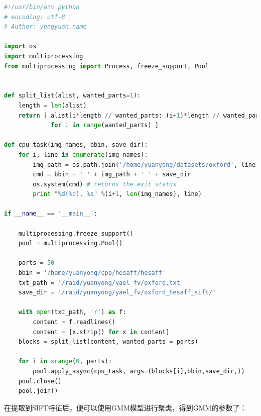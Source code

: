 \documentclass[color=cyan,mathpazo,titlestyle=hang]{elegantbook}
\begin{document}
\begin{lstlisting}[language=python]
#!/usr/bin/env python
# encoding: utf-8
# Author: yongyuan.name

import os
import multiprocessing
from multiprocessing import Process, freeze_support, Pool


def split_list(alist, wanted_parts=1):
    length = len(alist)
    return [ alist[i*length // wanted_parts: (i+1)*length // wanted_parts]
             for i in range(wanted_parts) ]
             
def cpu_task(img_names, bbin, save_dir):
    for i, line in enumerate(img_names):
        img_path = os.path.join('/home/yuanyong/datasets/oxford', line)
        cmd = bbin + ' ' + img_path + ' ' + save_dir
        os.system(cmd) # returns the exit status
        print "%d(%d), %s" %(i+1, len(img_names), line)

if __name__ == '__main__':

    multiprocessing.freeze_support()
    pool = multiprocessing.Pool()

    parts = 50
    bbin = '/home/yuanyong/cpp/hesaff/hesaff'
    txt_path = '/raid/yuanyong/yael_fv/oxford.txt'
    save_dir = '/raid/yuanyong/yael_fv/oxford_hesaff_sift/'

    with open(txt_path, 'r') as f:
        content = f.readlines()
        content = [x.strip() for x in content]
    blocks = split_list(content, wanted_parts = parts)

    for i in xrange(0, parts):
        pool.apply_async(cpu_task, args=(blocks[i],bbin,save_dir,))
    pool.close()
    pool.join()
\end{lstlisting}

在提取到SIFT特征后，便可以使用GMM模型进行聚类，得到GMM的参数了：
\end{document}
